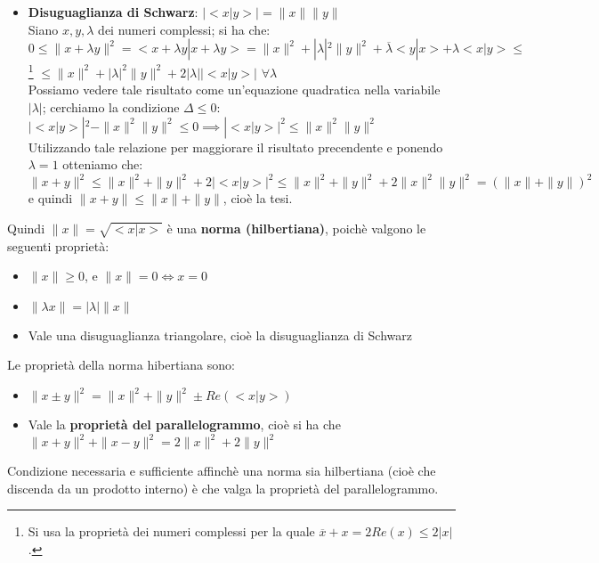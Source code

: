 \begin{itemize}
\item \textbf{Disuguaglianza di Schwarz}: $|<x|y>|=\|x\| \|y\|$ \\Siano $x,y,\lambda$ dei numeri complessi; si ha che: \\$0 \leq \|x+\lambda y\|^2=<x+\lambda y|x+\lambda y>=\|x\|^2+|\lambda|^2 \|y\|^2 + \overline{\lambda}<y|x> + \lambda <x|y> \leq$ \footnote{Si usa la proprietà dei numeri complessi per la quale $\overline{x} + x =2  Re(x) \leq 2|x|$.} $\leq \|x\|^2 +|\lambda|^2 \|y\|^2 +2|\lambda||<x|y>|$ $\forall \lambda$ \\Possiamo vedere tale risultato come un'equazione quadratica nella variabile $|\lambda|$; cerchiamo la condizione $\Delta \leq 0$: \\$|<x|y>|^2 - \|x\|^2 \|y\|^2 \leq 0 \implies |<x|y>|^2 \leq \|x\|^2 \|y\|^2$ \\Utilizzando tale relazione per maggiorare il risultato precendente e ponendo $\lambda=1$ otteniamo che: \\$\|x+y\|^2 \leq  \|x\|^2 + \|y\|^2 +2|<x|y>|^2 \leq \|x\|^2 +\|y\|^2+2\|x\|^2 \|y\|^2=(\|x\| + \|y\|)^2$ \\ e quindi $\|x+y\| \leq \|x\|+\|y\|$, cioè la tesi.
\end{itemize} Quindi $\|x\|=\sqrt{<x|x>}$ è una \textbf{norma (hilbertiana)}, poichè valgono le seguenti proprietà:

\begin{itemize}
\item $\|x\| \geq 0$, e $\|x\|=0 \iff x=0$
\item$\| \lambda x\|=| \lambda| \|x\|$
\item Vale una disuguaglianza triangolare, cioè la disuguaglianza di Schwarz
\end{itemize} Le proprietà della norma hibertiana sono:

\begin{itemize}
\item $\|x \pm y\|^2= \|x\|^2 +\|y\|^2 \pm Re(<x|y>)$
\item Vale la \textbf{proprietà del parallelogrammo}, cioè si ha che $\|x+y\|^2+\|x-y\|^2=2\|x\|^2 + 2 \|y\|^2$
\end{itemize}

\begin{teorema}

Condizione necessaria e sufficiente affinchè una norma sia  hilbertiana (cioè che discenda da un prodotto interno) è che valga la proprietà  del parallelogrammo.
\end{teorema}

